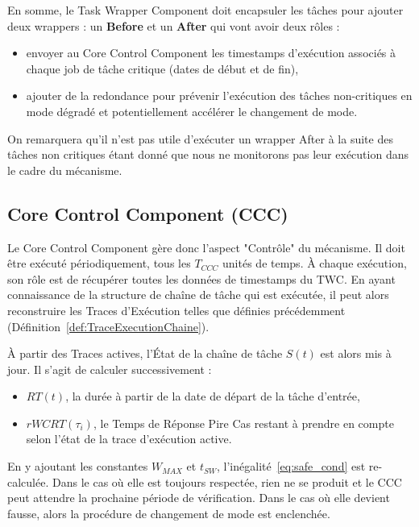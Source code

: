 \documentclass[french, a4paper, 11pt, twoside, pdftex]{StyleThese}
\begin{document}
        En somme, le Task Wrapper Component doit encapsuler les tâches pour ajouter deux wrappers : un \textbf{Before} et un \textbf{After} qui vont avoir deux rôles : 
        \begin{itemize}
        	\item envoyer au Core Control Component les timestamps d'exécution associés à chaque job de tâche critique (dates de début et de fin),
        	\item ajouter de la redondance pour prévenir l'exécution des tâches non-critiques en mode dégradé et potentiellement accélérer le changement de mode.
        \end{itemize}
		On remarquera qu'il n'est pas utile d'exécuter un wrapper After à la suite des tâches non critiques étant donné que nous ne monitorons pas leur exécution dans le cadre du mécanisme.

        \subsection{Core Control Component (CCC)}
        
        Le Core Control Component gère donc l'aspect "Contrôle" du mécanisme. Il doit être exécuté périodiquement, tous les $T_{CCC}$ unités de temps. À chaque exécution, son rôle est de récupérer toutes les données de timestamps du TWC. En ayant connaissance de la structure de chaîne de tâche qui est exécutée, il peut alors reconstruire les Traces d'Exécution telles que définies précédemment (Définition~\ref{def:TraceExecutionChaine}). 
        
        À partir des Traces actives, l'État de la chaîne de tâche $S(t)$ est alors mis à jour. Il s'agit de calculer successivement : 
        \begin{itemize}
        	\item $RT(t)$, la durée à partir de la date de départ de la tâche d'entrée,
        	\item $rWCRT(\tau_i)$, le Temps de Réponse Pire Cas restant à prendre en compte selon l'état de la trace d'exécution active.
        \end{itemize} 
	    En y ajoutant les constantes $W_{MAX}$ et $t_{SW}$, l'inégalité~\ref{eq:safe_cond} est re-calculée.
        Dans le cas où elle est toujours respectée, rien ne se produit et le CCC peut attendre la prochaine période de vérification. Dans le cas où elle devient fausse, alors la procédure de changement de mode est enclenchée. %
                
\end{document}
